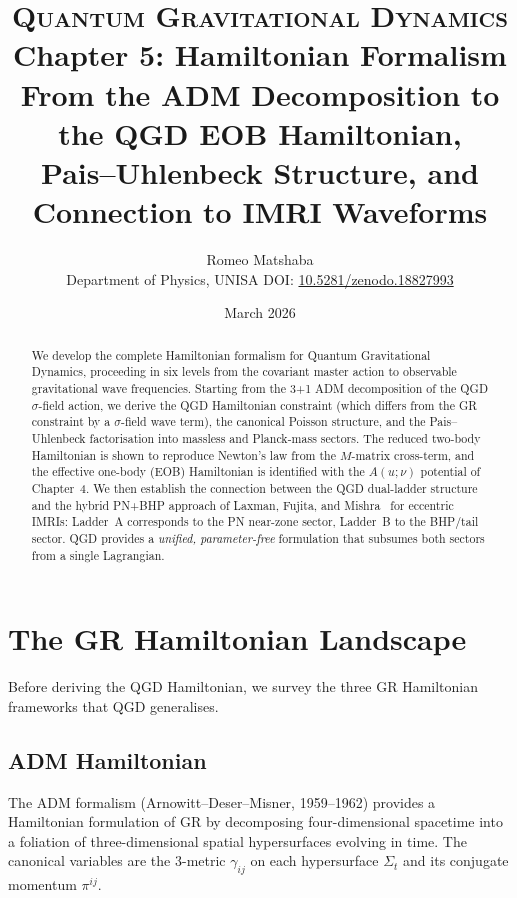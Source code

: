 \documentclass[11pt,a4paper]{article}
\title{%
  \vspace{-1.2cm}
  {\large\scshape Quantum Gravitational Dynamics}\\[6pt]
  {\LARGE\bfseries Chapter 5: Hamiltonian Formalism}\\[6pt]
  {\large From the ADM Decomposition to the QGD EOB Hamiltonian,\\
  Pais--Uhlenbeck Structure, and Connection to IMRI Waveforms}
}
\author{Romeo Matshaba\\[3pt]
  \small Department of Physics, UNISA\quad
  DOI: \href{https://doi.org/10.5281/zenodo.18827993}{10.5281/zenodo.18827993}}
\date{March 2026}
\theoremstyle{plain}
\theoremstyle{definition}
\theoremstyle{remark}
\begin{document}
\maketitle\thispagestyle{empty}

\begin{abstract}
\noindent
We develop the complete Hamiltonian formalism for Quantum Gravitational Dynamics,
proceeding in six levels from the covariant master action to observable gravitational
wave frequencies.  Starting from the 3+1 ADM decomposition of the QGD $\sigma$-field
action, we derive the QGD Hamiltonian constraint (which differs from the GR constraint
by a $\sigma$-field wave term), the canonical Poisson structure, and the
Pais--Uhlenbeck factorisation into massless and Planck-mass sectors.  The reduced
two-body Hamiltonian is shown to reproduce Newton's law from the $M$-matrix cross-term,
and the effective one-body (EOB) Hamiltonian is identified with the $A(u;\nu)$ potential
of Chapter~4.  We then establish the connection between the QGD dual-ladder structure
and the hybrid PN+BHP approach of Laxman, Fujita, and Mishra~\cite{LFM2026} for
eccentric IMRIs: Ladder~A corresponds to the PN near-zone sector, Ladder~B to the
BHP/tail sector.  QGD provides a \emph{unified, parameter-free} formulation that
subsumes both sectors from a single Lagrangian.
\end{abstract}

\tableofcontents\newpage

\section{The GR Hamiltonian Landscape}
\label{sec:GR_Ham}

Before deriving the QGD Hamiltonian, we survey the three GR Hamiltonian
frameworks that QGD generalises.

\subsection{ADM Hamiltonian}

The ADM formalism (Arnowitt--Deser--Misner, 1959--1962) provides a Hamiltonian
formulation of GR by decomposing four-dimensional spacetime into a foliation
of three-dimensional spatial hypersurfaces evolving in time.
The canonical variables are the 3-metric $\gamma_{ij}$ on each hypersurface $\Sigma_t$
and its conjugate momentum $\pi^{ij}$.
\end{document}
